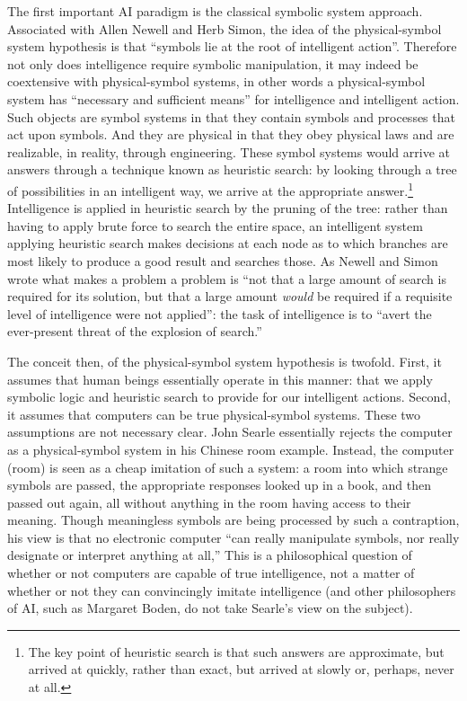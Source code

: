 The first important AI paradigm is the classical symbolic system
approach. Associated with Allen Newell and Herb Simon, the idea of the
physical-symbol system hypothesis is that ``symbols lie at the root of
intelligent action''\cite[p. 109]{newellsimon}. Therefore not only
does intelligence require symbolic manipulation, it may indeed be
coextensive with physical-symbol systems, in other words a
physical-symbol system has ``necessary and sufficient means'' for
intelligence and intelligent action.\cite[p. 111]{newellsimon} Such
objects are symbol systems in that they contain symbols and processes
that act upon symbols. And they are physical in that they obey
physical laws and are realizable, in reality, through engineering.
These symbol systems would arrive at answers through a technique known as
heuristic search: by looking through a tree of possibilities in an
intelligent way, we arrive at the appropriate answer.\footnote{The key
  point of heuristic search is that such answers are approximate, but
  arrived at quickly, rather than exact, but arrived at slowly or,
  perhaps, never at all.} Intelligence is applied in heuristic search
by the pruning of the tree: rather than having to apply brute force to
search the entire space, an intelligent system applying heuristic
search makes decisions at each node as to which branches are most
likely to produce a good result and searches those.\cite[p.
  124]{newellsimon} As Newell and Simon wrote what makes a problem a
problem is ``not that a large amount of search is required for its
solution, but that a large amount \emph{would} be required if a requisite
level of intelligence were not applied'': the task of intelligence is
to ``avert the ever-present threat of the explosion of
search.''\cite[p. 125]{newellsimon} 

The conceit then, of the physical-symbol system hypothesis is twofold.
First, it assumes that
human beings essentially operate in this manner: that we apply
symbolic logic and heuristic search to provide for our intelligent
actions. Second, it assumes that computers can be true physical-symbol
systems. These two assumptions are not necessary clear. John Searle
essentially rejects the computer as a physical-symbol system in his
Chinese room example. Instead, the computer (room) is seen as a cheap
imitation of such a system: a room into which strange symbols are
passed, the appropriate responses looked up in a book,
and then passed out again, all without anything in the room having
access to their meaning.\cite{chineseSearle} Though meaningless
symbols are being processed by such a contraption, his view is that no
electronic computer ``can really manipulate symbols, nor really
designate or interpret anything at all,''\cite{escapingBoden} This is
a philosophical question of whether or not computers are capable of
true intelligence, not a matter of whether or not they can
convincingly imitate intelligence (and other philosophers of AI, such
as Margaret Boden, do not take Searle's view on the subject). 


